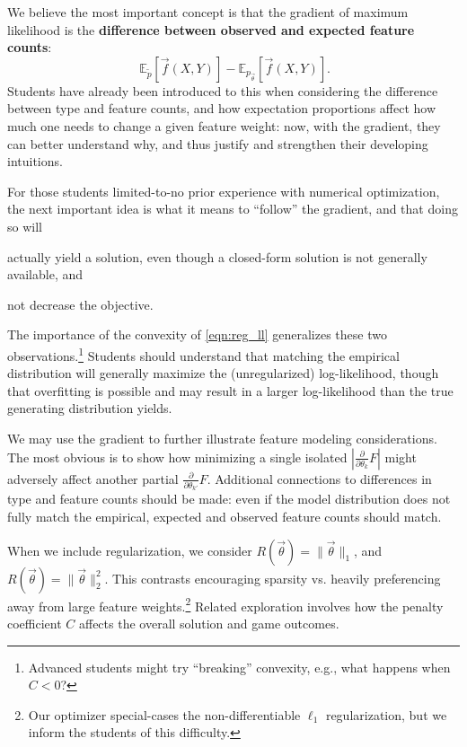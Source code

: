 \documentclass[11pt,letterpaper]{article}
\newcommand{\empirical}[0]{\ensuremath{\tilde{p}}}
\begin{document}
We believe the most important concept is that the gradient of
maximum likelihood is the \textbf{difference 
between observed and expected feature counts}:
\begin{equation}
\ \mathbb{E}_{\empirical{}}\left[\vec{f}(X,Y)\right] 
- \mathbb{E}_{p_{\vec{\theta}}}\left[\vec{f}(X,Y)\right].
\label{eqn:obsexp} 
\end{equation}
Students have already been introduced to this when considering the difference between type and 
feature counts, and how expectation proportions affect how much one needs to change a given feature weight: 
now, with the gradient, they can better understand why, and thus justify and strengthen their developing intuitions.

For those students limited-to-no prior experience with numerical optimization, the next 
important idea is what it means to ``follow'' the gradient, and that doing so will 
\begin{inparaenum}[i)]
\item actually yield a solution, even though a closed-form solution is not generally available, and
\item not decrease the objective.
\end{inparaenum}
The importance of the convexity of \eqref{eqn:reg_ll} generalizes these two observations.\footnote{Advanced 
students might try ``breaking'' convexity, e.g., what happens when $C < 0$?}
Students should understand that matching the empirical distribution will generally maximize the (unregularized) log-likelihood, 
though that overfitting is possible and may result in a larger log-likelihood than the true generating distribution yields.

We may use the gradient to further illustrate feature modeling considerations. The most obvious is to show how 
minimizing a single isolated $|\frac{\partial}{\partial \theta_k} F|$ might adversely affect another partial 
$\frac{\partial}{\partial \theta_{k'}}F$. Additional connections to differences in type and feature counts should be 
made: even if the model distribution does not fully match the empirical, expected and observed feature 
counts should match.

When we include regularization, we consider $R(\vec{\theta}) = \|\vec\theta\|_1$, and 
$R(\vec{\theta}) = \|\vec{\theta}\|_2^2$. This contrasts encouraging sparsity vs.  
heavily preferencing away from large feature weights.\footnote{Our optimizer special-cases 
the non-differentiable $\ell_1$ regularization, but we inform the students of this difficulty.} 
Related exploration involves how the penalty coefficient $C$ affects the overall solution and game outcomes.
\end{document}
